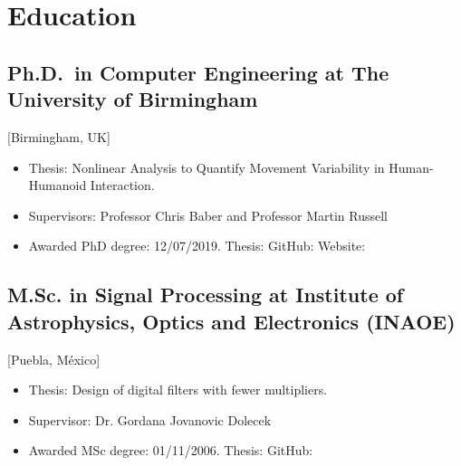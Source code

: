 \documentclass{mycv}
\begin{document}
\section{Education}
\subsection{Ph.D.\ in Computer Engineering at The University of Birmingham}[Birmingham, UK]
\begin{itemize}[label={}]
  \item Thesis: Nonlinear Analysis to Quantify Movement Variability in Human-Humanoid Interaction. 
  \item Supervisors: Professor Chris Baber and  Professor Martin Russell
  \item	Awarded PhD degree: 12/07/2019. Thesis: \href{https://doi.org/10.5281/zenodo.3384145}{\faFilePdf}
	GitHub: \href{http://doi.org/10.5281/zenodo.3384281}{\faGithub*}
	Website: \href{https://mxochicale-phd.github.io/site/}{\faExternalLink*}
\end{itemize}

\subsection{M.Sc. in Signal Processing at Institute of Astrophysics, Optics and Electronics (INAOE)}[Puebla, M\'exico]
\begin{itemize}[label={}]
  \item Thesis: Design of digital filters with fewer multipliers. 
  \item Supervisor: Dr. Gordana Jovanovic Dolecek
  \item Awarded MSc degree: 01/11/2006.
  	Thesis: \href{https://github.com/mxochicale/publications/blob/master/thesis/M.Sc./doc/MPXochicale_MScThesis-2016.pdf}{\faFilePdf}
	GitHub: \href{https://github.com/mxochicale/publications/tree/master/thesis/M.Sc.}{\faGithub*}
\end{itemize}
\end{document}
